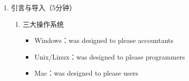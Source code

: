 \documentclass{TIJMUjiaoanLL}
\begin{document}
\firstTail


\newpage
\otherHeader

\begin{enumerate}
  \item 引言与导入（5分钟）
    \begin{enumerate}
      \item 三大操作系统
	\begin{itemize}
	  \item Windows：was designed to please accountants
	  \item Unix/Linux：was designed to please programmers
	  \item Mac：was designed to please users
	\end{itemize}
    \end{enumerate}


\end{enumerate}
\end{document}
